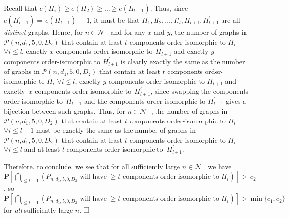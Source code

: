 \documentclass{article}
\newtheorem{Proof of Theorem}{Proof of Theorem}
\begin{document}
Recall that $e(H_{i}) \!\geq\! e(H_{2}) \!\geq\! \ldots \!\geq\! e(H_{l+1})$.
Thus, since $e(H_{l+1}^{\prime}) \!=~\!\!e(H_{l+1}) \!-~\!\!1$,
it must be that $H_{1},H_{2}, \ldots, H_{l},H_{l+1},H_{l+1}^{\prime}$
are all \textit{distinct} graphs.
Hence, for $n \in \mathcal{N}^{=}$ and for any $x$ and $y$,
the number of graphs in $\mathcal{P}(n,d_{1},5,0,D_{2})$
that contain at least $t$ components order-isomorphic to $H_{i}$ $\forall i \leq l$,
exactly $x$ components order-isomorphic to~$H_{l+1}$
and exactly $y$ components order-isomorphic to $H_{l+1}^{\prime}$
is clearly exactly the same as the number of graphs in $\mathcal{P}(n,d_{1},5,0,D_{2})$
that contain at least $t$ components order-isomorphic to $H_{i}$ $\forall i \leq l$,
exactly $y$ components order-isomorphic to $H_{l+1}$
and exactly~$x$ components order-isomorphic to~$H_{l+1}^{\prime}$,
since swapping the components order-isomorphic to~$H_{l+1}$
and the components order-isomorphic to $H_{l+1}^{\prime}$ 
gives a bijection between such graphs.
Thus, for $n \in \mathcal{N}^{=}$, 
the number of graphs in $\mathcal{P}(n,d_{1},5,0,D_{2})$ that contain
at least $t$ components order-isomorphic to $H_{i}$ $\forall i \leq l+1$
must be exactly the same as the number of graphs in $\mathcal{P}(n,d_{1},5,0,D_{2})$ that contain
at least $t$ components order-isomorphic to $H_{i}$ $\forall i \leq l$
and at least $t$ components order-isomorphic to~$H_{l+1}^{\prime}$.

Therefore, to conclude,
we see that for all sufficiently large $n \in \mathcal{N}^{=}$ we have
$\mathbf{P}\left[ \bigcap_{i \leq l+1} \left(P_{n,d_{1},5,0,D_{2}} 
\textrm{ will have $\!\geq\! t$ components order-isomorphic to $H_{i}$} \right) \right] >~\!c_{2}$,
so 
$\mathbf{P}\left[ \bigcap_{i \leq l+1} \left(P_{n,d_{1},5,0,D_{2}} 
\textrm{ will have $\geq t$ components order-isomorphic to $H_{i}$} \right) \right] > \min\{c_{1},c_{2}\}$
for \textit{all} sufficiently large $n$.
\phantom{qwerty}
$\setlength{\unitlength}{.25cm}
\begin{picture}(1,1)
\put(0,0){\line(1,0){1}}
\put(0,0){\line(0,1){1}}
\put(1,1){\line(-1,0){1}}
\put(1,1){\line(0,-1){1}}
\end{picture}$ \\
\\
\end{document}
